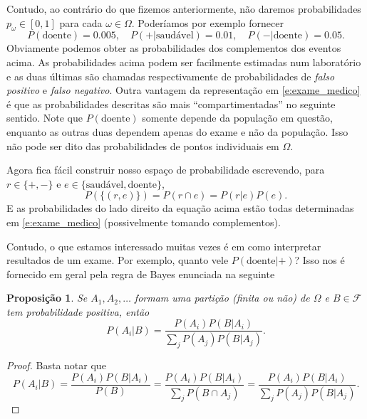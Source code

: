 \documentclass[reqno, draft]{book}
\newcommand*\1{\mathds{1}}
\newtheorem{proposition}[theorem]{Proposição}
\begin{document}
Contudo, ao contrário do que fizemos anteriormente, não daremos probabilidades $p_\omega \in [0,1]$ para cada $\omega \in \Omega$.
Poderíamos por exemplo fornecer
\begin{equation}
  \label{e:exame_medico}
  P(\text{doente}) = 0.005, \quad P( + | \text{saudável}) = 0.01, \quad P( - | \text{doente}) = 0.05.
\end{equation}
Obviamente podemos obter as probabilidades dos complementos dos eventos acima.
As probabilidades acima podem ser facilmente estimadas num laboratório e as duas últimas são chamadas respectivamente de probabilidades de \emph{falso positivo} e \emph{falso negativo}.
Outra vantagem da representação em \eqref{e:exame_medico} é que as probabilidades descritas são mais ``compartimentadas'' no seguinte sentido.
Note que $P(\text{doente})$ somente depende da população em questão, enquanto as outras duas dependem apenas do exame e não da população.
Isso não pode ser dito das probabilidades de pontos individuais em $\Omega$.

Agora fica fácil construir nosso espaço de probabilidade escrevendo, para $r \in \{+, -\}$ e $e \in \{\text{saudável}, \text{doente}\}$,
\begin{equation}
  P(\{(r,e)\}) = P(r \cap e) = P(r | e) P(e).
\end{equation}
E as probabilidades do lado direito da equação acima estão todas determinadas em \eqref{e:exame_medico} (possivelmente tomando complementos).

Contudo, o que estamos interessado muitas vezes é em como interpretar resultados de um exame.
Por exemplo, quanto vele $P(\text{doente} | +)$?
Isso nos é fornecido em geral pela regra de Bayes enunciada na seguinte

\begin{proposition}
  Se $A_1, A_2, \dots$ formam uma partição (finita ou não) de $\Omega$ e $B \in \mathcal{F}$ tem probabilidade positiva, então
  \begin{equation}
    P(A_i | B) = \frac{P(A_i) P(B | A_i)}{\sum_j P(A_j) P(B | A_j)}.
  \end{equation}
\end{proposition}

\begin{proof}
  Basta notar que
  \begin{equation}
    P(A_i | B) = \frac{P(A_i) P(B | A_i)}{P(B)} = \frac{P(A_i) P(B | A_i)}{\sum_j P(B \cap A_j)} = \frac{P(A_i) P(B | A_i)}{\sum_j P(A_j) P(B | A_j)}.
  \end{equation}
\end{proof}
\end{document}
